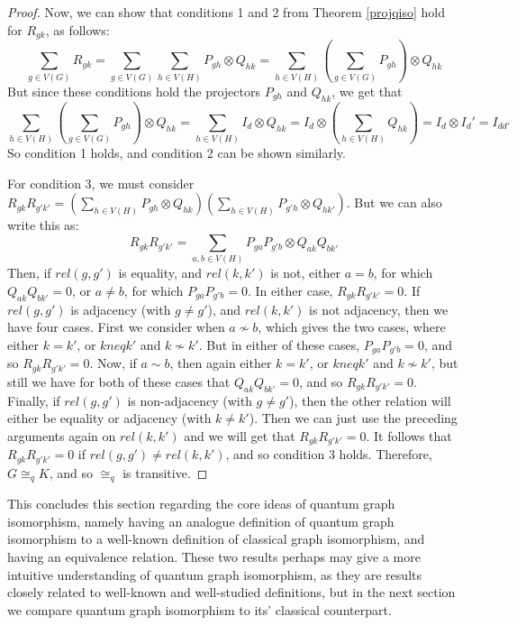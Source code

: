 \documentclass[12pt]{article}
\begin{document}
\begin{proof}
Now,  we can show that conditions 1 and 2 from Theorem \ref{projqiso} hold for $R_{gk}$, as follows: 
\begin{equation}
\sum_{g \in V(G)} R_{gk} = \sum_{g \in V(G)} \sum_{h \in V(H)} P_{gh} \otimes Q_{hk} = \sum_{h \in V(H)} (\sum_{g \in V(G)} P_{gh}) \otimes Q_{hk}
\end{equation} 
But since these conditions hold the projectors $P_{gh}$ and $Q_{hk}$, we get that
\begin{equation}
\sum_{h \in V(H)} (\sum_{g \in V(G)} P_{gh}) \otimes Q_{hk} = \sum_{h \in V(H)} I_d \otimes Q_{hk} = I_d \otimes (\sum_{h \in V(H)} Q_{hk}) = I_d \otimes I_d' = I_{dd'}
\end{equation}
So condition 1 holds, and condition 2 can be shown similarly.

For condition 3, we must consider $R_{gk}R_{g'k'} =(\sum_{h \in V(H)} P_{gh} \otimes Q_{hk})(\sum_{h \in V(H)} P_{g'h} \otimes Q_{hk'})$. But we can also write this as:
\begin{equation}
R_{gk}R_{g'k'} = \sum_{a, b \in V(H)} P_{ga}P_{g'b} \otimes Q_{ak}Q_{bk'}
\end{equation}
Then, if $rel(g, g')$ is equality, and $rel(k, k')$ is not, either $a=b$, for which $Q_{ak}Q_{bk'} = 0$, or $a \neq b$, for which $P_{ga}P_{g'b} = 0$. In either case, $R_{gk}R_{g'k'} = 0$.
If $rel(g, g')$ is adjacency (with $g \neq g'$), and $rel(k, k')$ is not adjacency, then we have four cases. First we consider when $a \nsim b$, which gives the two cases, where either $k = k'$, or $k neq k'$ and $k \nsim k'$. But in either of these cases, $P_{ga}P_{g'b} = 0$, and so $R_{gk}R_{g'k'} = 0$. Now, if $a \sim b$, then again either $k = k'$, or $k neq k'$ and $k \nsim k'$, but still we have for both of these cases that $Q_{ak}Q_{bk'} = 0$, and so $R_{gk}R_{g'k'} = 0$.
Finally, if $rel(g, g')$ is non-adjacency (with $g \neq g'$), then the other relation will either be equality or adjacency (with $k \neq k'$). Then we can just use the preceding arguments again on $rel(k, k')$ and we will get that $R_{gk}R_{g'k'} = 0$. 
It follows that $R_{gk}R_{g'k'} = 0$ if $rel(g, g') \neq rel(k, k')$, and so condition 3 holds.
Therefore, $G \cong_q K$, and so $\cong_q$ is transitive.
\end{proof}

This concludes this section regarding the core ideas of quantum graph isomorphism, namely having an analogue definition of quantum graph isomorphism to a well-known definition of classical graph isomorphism, and having an equivalence relation. These two results perhaps may give a more intuitive understanding of quantum graph isomorphism, as they are results closely related to well-known and well-studied definitions, but in the next section we compare quantum graph isomorphism to its' classical counterpart.
\end{document}
